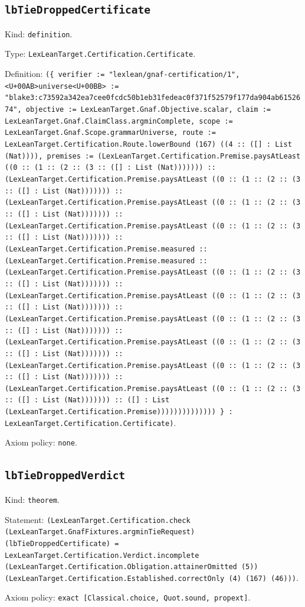 \documentclass[11pt]{article}
\begin{document}
\subsection*{\texttt{lbTieDroppedCertificate}}
\noindent Kind: \texttt{definition}.\par
\noindent Type: \texttt{LexLeanTarget.Certification.Certificate}.\par
\noindent Definition: \texttt{(\{ verifier := "lexlean/gnaf-certification/1", <U+00AB>universe<U+00BB> := "blake3:c73592a342ea7cee0fcdc50b1eb31fedeac0f371f52579f177da904ab6152674", objective := LexLeanTarget.Gnaf.Objective.scalar, claim := LexLeanTarget.Gnaf.ClaimClass.argminComplete, scope := LexLeanTarget.Gnaf.Scope.grammarUniverse, route := LexLeanTarget.Certification.Route.lowerBound (167) ((4 :: ([] : List (Nat)))), premises := (LexLeanTarget.Certification.Premise.paysAtLeast ((0 :: (1 :: (2 :: (3 :: ([] : List (Nat))))))) :: (LexLeanTarget.Certification.Premise.paysAtLeast ((0 :: (1 :: (2 :: (3 :: ([] : List (Nat))))))) :: (LexLeanTarget.Certification.Premise.paysAtLeast ((0 :: (1 :: (2 :: (3 :: ([] : List (Nat))))))) :: (LexLeanTarget.Certification.Premise.paysAtLeast ((0 :: (1 :: (2 :: (3 :: ([] : List (Nat))))))) :: (LexLeanTarget.Certification.Premise.measured :: (LexLeanTarget.Certification.Premise.measured :: (LexLeanTarget.Certification.Premise.paysAtLeast ((0 :: (1 :: (2 :: (3 :: ([] : List (Nat))))))) :: (LexLeanTarget.Certification.Premise.paysAtLeast ((0 :: (1 :: (2 :: (3 :: ([] : List (Nat))))))) :: (LexLeanTarget.Certification.Premise.paysAtLeast ((0 :: (1 :: (2 :: (3 :: ([] : List (Nat))))))) :: (LexLeanTarget.Certification.Premise.paysAtLeast ((0 :: (1 :: (2 :: (3 :: ([] : List (Nat))))))) :: (LexLeanTarget.Certification.Premise.paysAtLeast ((0 :: (1 :: (2 :: (3 :: ([] : List (Nat))))))) :: (LexLeanTarget.Certification.Premise.paysAtLeast ((0 :: (1 :: (2 :: (3 :: ([] : List (Nat))))))) :: ([] : List (LexLeanTarget.Certification.Premise)))))))))))))) \} : LexLeanTarget.Certification.Certificate)}.\par
\noindent Axiom policy: \texttt{none}.\par
\subsection*{\texttt{lbTieDroppedVerdict}}
\noindent Kind: \texttt{theorem}.\par
\noindent Statement: \texttt{(LexLeanTarget.Certification.check (LexLeanTarget.GnafFixtures.argminTieRequest) (lbTieDroppedCertificate) = LexLeanTarget.Certification.Verdict.incomplete (LexLeanTarget.Certification.Obligation.attainerOmitted (5)) (LexLeanTarget.Certification.Established.correctOnly (4) (167) (46)))}.\par
\noindent Axiom policy: \texttt{exact [Classical.choice, Quot.sound, propext]}.\par
\end{document}
